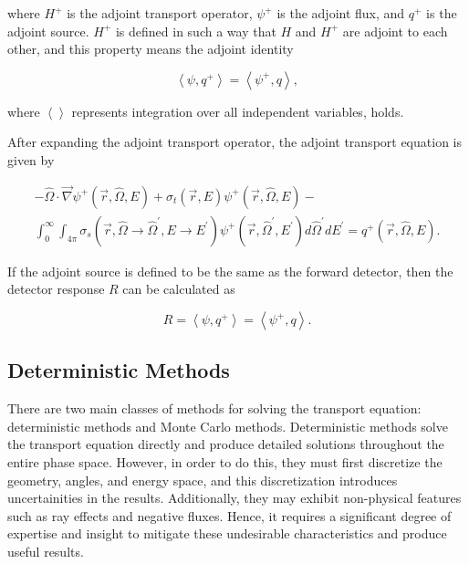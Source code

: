 where $H^+$ is the adjoint transport operator, $\psi^+$ is the adjoint flux, and $q^+$ is the adjoint source.
$H^+$ is defined in such a way that $H$ and $H^+$ are adjoint to each other, and this property means the adjoint identity

\begin{equation}\label{eq:bg:rt:adjoint-identity}
  \left<\psi,q^+\right> =
  \left<\psi^+,q\right>,
\end{equation}

where $\left<\right>$ represents integration over all independent variables, holds.

After expanding the adjoint transport operator, the adjoint transport equation is given by

\begin{multline}\label{eq:bg:rt:adjoint-transport}
  -\hat{\Omega}\cdot\vec{\nabla}\psi^+\left(\vec{r},\hat{\Omega},E\right) +
  \sigma_t\left(\vec{r},E\right)\psi^+\left(\vec{r},\hat{\Omega},E\right) - \\
  \int_0^\infty\int_{4\pi}\sigma_s\left(\vec{r},\hat{\Omega}\rightarrow\hat{\Omega}^\prime,E\rightarrow E^\prime\right)\psi^+\left(\vec{r},\hat{\Omega}^\prime,E^\prime\right)d\hat{\Omega}^\prime dE^\prime =
  q^+\left(\vec{r},\hat{\Omega},E\right).
\end{multline}

If the adjoint source is defined to be the same as the forward detector, then the detector response $R$ can be calculated as

\begin{equation}\label{eq:bg:rt:detector-response}
  R = \left<\psi,q^+\right>
    = \left<\psi^+,q\right>.
\end{equation}

\subsection{Deterministic Methods}
\label{sec:bg:rt:determ}

There are two main classes of methods for solving the transport equation: deterministic methods and Monte Carlo methods.
Deterministic methods solve the transport equation directly and produce detailed solutions throughout the entire phase space.
However, in order to do this, they must first discretize the geometry, angles, and energy space, and this discretization introduces uncertainities in the results.
Additionally, they may exhibit non-physical features such as ray effects and negative fluxes.
Hence, it requires a significant degree of expertise and insight to mitigate these undesirable characteristics and produce useful results.

